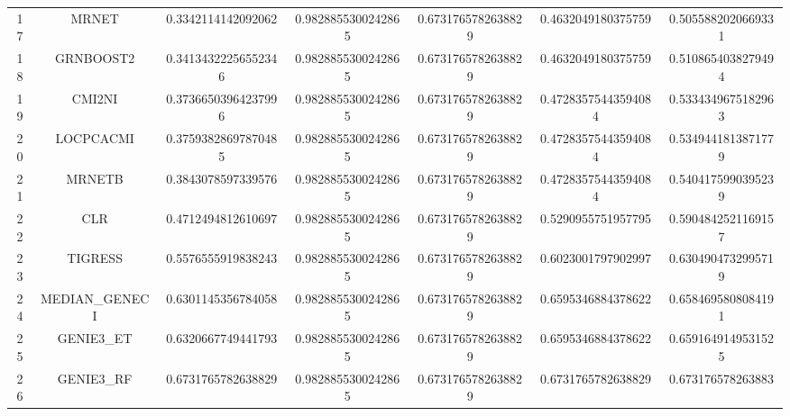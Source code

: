 \documentclass[a4paper,10pt]{article}
\begin{document}
\begin{landscape}
\begin{table}[!htp]
\begin{tabular}{ccccccc}
17&MRNET&0.3342114142092062&0.9828855300242865&0.6731765782638829&0.4632049180375759&0.5055882020669331\\
18&GRNBOOST2&0.34134322256552346&0.9828855300242865&0.6731765782638829&0.4632049180375759&0.5108654038279494\\
19&CMI2NI&0.37366503964237996&0.9828855300242865&0.6731765782638829&0.47283575443594084&0.5334349675182963\\
20&LOCPCACMI&0.37593828697870485&0.9828855300242865&0.6731765782638829&0.47283575443594084&0.5349441813871779\\
21&MRNETB&0.3843078597339576&0.9828855300242865&0.6731765782638829&0.47283575443594084&0.5404175990395239\\
22&CLR&0.4712494812610697&0.9828855300242865&0.6731765782638829&0.5290955751957795&0.5904842521169157\\
23&TIGRESS&0.5576555919838243&0.9828855300242865&0.6731765782638829&0.6023001797902997&0.6304904732995719\\
24&MEDIAN_GENECI&0.6301145356784058&0.9828855300242865&0.6731765782638829&0.6595346884378622&0.6584695808084191\\
25&GENIE3_ET&0.6320667749441793&0.9828855300242865&0.6731765782638829&0.6595346884378622&0.6591649149531525\\
26&GENIE3_RF&0.6731765782638829&0.9828855300242865&0.6731765782638829&0.6731765782638829&0.673176578263883\\
\hline
\end{tabular}
\end{table}

\end{landscape}
\end{document}
